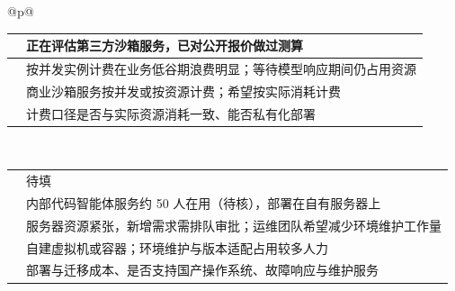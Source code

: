 \begin{longtable}{@{}p{\linewidth}@{}}
\begin{minipage}{\linewidth}
\begin{tabular}{@{}>{\raggedright\arraybackslash}p{}>{\raggedright\arraybackslash}p{}@{}}
\rowcolor{white} \TableHeaderText{当前部署与使用情况} & 正在评估第三方沙箱服务，已对公开报价做过测算 \\ \hline
\rowcolor{white} \TableHeaderText{核心痛点} & 按并发实例计费在业务低谷期浪费明显；等待模型响应期间仍占用资源 \\ \hline
\rowcolor{white} \TableHeaderText{现有方案与不足} & 商业沙箱服务按并发或按资源计费；希望按实际消耗计费 \\ \hline
\rowcolor{white} \TableHeaderText{采购关注点} & 计费口径是否与实际资源消耗一致、能否私有化部署 \\ \hline
\end{tabular}
\end{minipage} \\[6pt]
\begin{minipage}{\linewidth}
\begin{tabular}{@{}>{\raggedright\arraybackslash}p{}>{\raggedright\arraybackslash}p{}@{}}
\hline
\rowcolor{WordTableHeader}\multicolumn{2}{@{}p{\linewidth}@{}}{\RecordHeading{编号：I-03\quad 受访角色与企业类型：企业内部研发中心 · 研发管理负责人}} \\ \hline
\rowcolor{white} \TableHeaderText{访谈时间与方式} & 待填 \\ \hline
\rowcolor{white} \TableHeaderText{当前部署与使用情况} & 内部代码智能体服务约 50 人在用（待核），部署在自有服务器上 \\ \hline
\rowcolor{white} \TableHeaderText{核心痛点} & 服务器资源紧张，新增需求需排队审批；运维团队希望减少环境维护工作量 \\ \hline
\rowcolor{white} \TableHeaderText{现有方案与不足} & 自建虚拟机或容器；环境维护与版本适配占用较多人力 \\ \hline
\rowcolor{white} \TableHeaderText{采购关注点} & 部署与迁移成本、是否支持国产操作系统、故障响应与维护服务 \\ \hline
\end{tabular}
\end{minipage} \\[6pt]
\begin{minipage}{\linewidth}
\begin{tabular}{@{}>{\raggedright\arraybackslash}p{}>{\raggedright\arraybackslash}p{}@{}}
\hline
\rowcolor{WordTableHeader}\multicolumn{2}{@{}p{\linewidth}@{}}{\RecordHeading{编号：I-04\quad 受访角色与企业类型：企业内部研发中心 · 信息化部门}} \\ \hline

\end{tabular}
\end{minipage}
\end{longtable}
